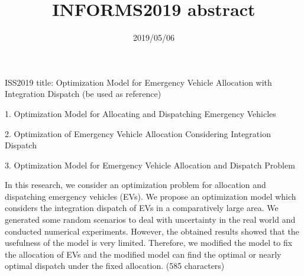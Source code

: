 \documentclass[a4j]{jarticle}
\title{INFORMS2019 abstract}
\begin{document}
\date{2019/05/06}
\maketitle
ISS2019 title: Optimization Model for Emergency Vehicle Allocation with Integration Dispatch (be used as reference)



1. Optimization Model for Allocating and Dispatching Emergency Vehicles

2. Optimization of Emergency Vehicle Allocation Considering Integration Dispatch

3. Optimization Model for Emergency Vehicle Allocation and Dispatch Problem



 In this research, we consider an optimization problem for allocation and dispatching emergency vehicles (EVs). We propose an optimization model which considers the integration dispatch of EVs in a comparatively large area. We generated some random scenarios to deal with uncertainty in the real world and conducted numerical experiments. However, the obtained results showed that the usefulness of the model is very limited. Therefore, we modified the model to fix the allocation of EVs and the modified model can find the optimal or nearly optimal dispatch under the fixed allocation. (585 characters)
\end{document}
